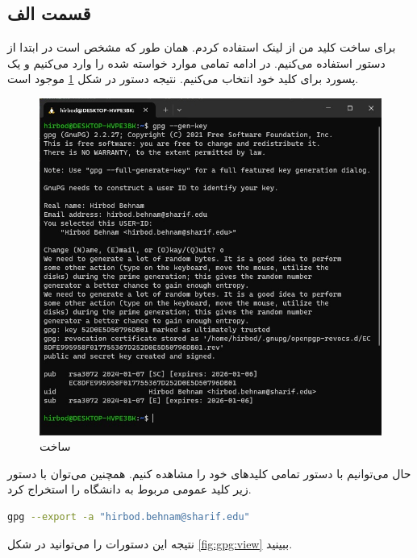 \documentclass[]{article}
\begin{document}
\subsection*{قسمت الف}
برای ساخت کلید من از
لینک استفاده کردم. همان طور که مشخص است در ابتدا از دستور
استفاده می‌کنیم. در ادامه تمامی موارد خواسته شده را وارد می‌کنیم و یک پسورد برای کلید خود انتخاب می‌کنیم.
نتیجه دستور در شکل
\ref{fig:gpg:keygen}
موجود است.
\begin{figure}[H]
    \centering
    \includegraphics[scale=0.75]{pics/gpg-keygen.jpg}
    \caption{ساخت }
    \label{fig:gpg:keygen}
\end{figure}
حال می‌توانیم با دستور
تمامی کلید‌های خود را مشاهده کنیم. همچنین می‌توان با دستور زیر کلید عمومی مربوط به دانشگاه را استخراج کرد.
\begin{latin}
\begin{lstlisting}[language=sh]
gpg --export -a "hirbod.behnam@sharif.edu"
\end{lstlisting}
\end{latin}
نتیجه این دستورات را می‌توانید در شکل
\ref{fig:gpg:view}
ببینید.
\end{document}
